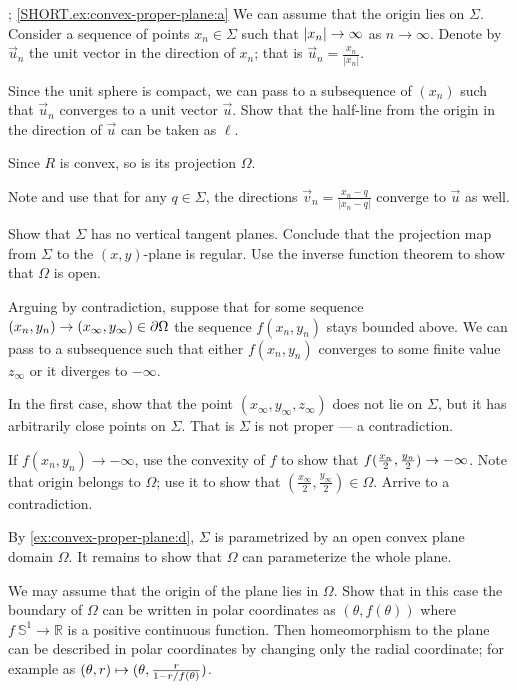 \parbf{\ref{ex:convex-proper-plane}}; \ref{SHORT.ex:convex-proper-plane:a}
We can assume that the origin lies on $\Sigma$.
Consider a sequence of points $x_n\in \Sigma$ such that $|x_n|\z\to \infty$ as $n\to \infty$.
Denote by $\vec u_n$ the unit vector in the direction of $x_n$; that is $\vec u_n=\tfrac{x_n}{|x_n|}$.

Since the unit sphere is compact, we can pass to a subsequence of $(x_n)$ such that $\vec u_n$ converges to a unit vector $\vec u$.
Show that the half-line from the origin in the direction of $\vec u$ can be taken as $\ell$.


Since $R$ is convex, so is its projection $\Omega$.

Note and use that for any $q\in \Sigma$, the directions $\vec v_n=\tfrac{x_n-q}{|x_n-q|}$ converge to $\vec u$ as well.

Show that $\Sigma$ has no vertical tangent planes.
Conclude that the projection map from $\Sigma$ to the $(x,y)$-plane is regular.
Use the inverse function theorem to show that $\Omega$ is open.

Arguing by contradiction, suppose that for some sequence $(x_n,y_n)\z\to(x_\infty,y_\infty)\in \partial\Omega$ the sequence $f(x_n,y_n)$ stays bounded above.
We can pass to a subsequence such that either $f(x_n,y_n)$ converges to some finite value $z_\infty$ or it diverges to $-\infty$.

In the first case, show that the point $(x_\infty, y_\infty,z_\infty)$ does not lie on $\Sigma$, but it has arbitrarily close points on $\Sigma$.
That is $\Sigma$ is not proper --- a contradiction.

If $f(x_n,y_n)\to -\infty$, use the convexity of $f$ to show that $f(\tfrac{x_n}2 ,\tfrac{y_n}2)\z\to -\infty$.
Note that origin belongs to $\Omega$;
use it to show that $(\tfrac{x_\infty}2, \tfrac{y_\infty}2)\in\Omega$.
Arrive to a contradiction.

By \ref{ex:convex-proper-plane:d}, $\Sigma$ is parametrized by an open convex plane domain $\Omega$.
It remains to show that $\Omega$ can parameterize the whole plane.

We may assume that the origin of the plane lies in $\Omega$.
Show that in this case the boundary of $\Omega$ can be written in polar coordinates as $(\theta,f(\theta))$ where $f\:\mathbb{S}^1\to\mathbb{R}$ is a positive continuous function.
Then homeomorphism to the plane can be described in polar coordinates by changing only the radial coordinate;
for example as 
$(\theta,r)\z\mapsto (\theta,
\tfrac{r}{1-r/f(\theta)})$.

